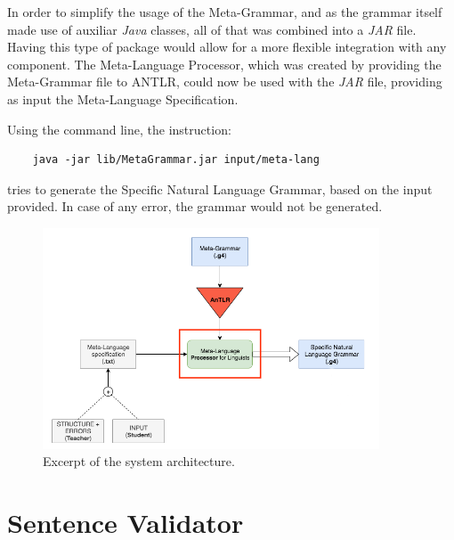 In order to simplify the usage of the Meta-Grammar, and as the grammar itself made use of auxiliar \emph{Java} classes, all of that was combined into a \emph{JAR} file.
Having this type of package would allow for a more flexible integration with any component.
The Meta-Language Processor, which was created by providing the Meta-Grammar file to ANTLR, could now be used with the \emph{JAR} file, 
providing as input the Meta-Language Specification. 

Using the command line, the instruction:
\begin{Verbatim}
	java -jar lib/MetaGrammar.jar input/meta-lang
\end{Verbatim}
\noindent tries to generate the Specific Natural Language Grammar, based on the input provided. In case of any error, the grammar would not be generated.

\begin{figure}[h]
    \centering
    \includegraphics[width=10cm]{images/system_meta_processor.png}
    \caption{Excerpt of the system architecture.}
    \label{fig:system_architecture}
\end{figure}

\section{Sentence Validator}

